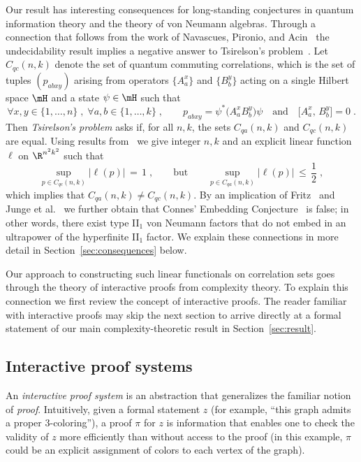 Our result has interesting consequences for long-standing conjectures in quantum information theory and the theory of von Neumann algebras. Through a connection that follows from the work of Navascues, Pironio, and Acin~\cite{navascues2008convergent} the undecidability result implies a negative answer to Tsirelson's problem~\cite{Tsi06}. Let $C_{qc}(n,k)$ denote the set of quantum commuting correlations, which is the set of tuples $(p_{abxy})$ arising from operators $\{A^x_a\}$ and $\{B^y_b\}$ acting on a single Hilbert space $\mH$ and a state $\psi \in \mH$ such that
\begin{equation}\label{eq:intro-qc}
 \forall x,y\in \{1,\ldots,n\}\;,\;\forall a,b\in\{1,\ldots,k\}\;,\qquad p_{abxy} = \psi^* \big( A^x_a B^y_b\big) \psi \quad\text{and}\quad  \big[A^x_a,\,B^y_b\big]=0\;.
\end{equation}
Then \emph{Tsirelson's problem} asks if, for all $n,k$, the sets $C_{qa}(n,k)$ and $C_{qc}(n,k)$ are equal. 
Using results from~\cite{navascues2008convergent} we give integer $n,k$ and an explicit linear function $\ell$ on $\R^{n^2k^2}$ such that 
\[ \sup_{p\in C_{qc}(n,k)} \big|\ell(p)\big| \,=\,1\;,\qquad\text{but}\qquad \sup_{p\in C_{qa}(n,k)} \big|\ell(p)\big| \,\leq\,\frac{1}{2}\;,\]
which implies that $C_{qa}(n,k)\neq C_{qc}(n,k)$. 
By an implication of Fritz~\cite{fritz2012tsirelson} and Junge et al.~\cite{junge2011connes} we further obtain that Connes' Embedding Conjecture~\cite{connes1976classification} is false; in other words, there exist type II$_1$ von Neumann factors that do not embed in an ultrapower of the hyperfinite II$_1$ factor. We explain these connections in more detail in Section~\ref{sec:consequences} below.

Our approach to constructing such linear functionals on correlation sets goes through the theory of 
interactive proofs from complexity theory. 
To explain this connection we first review the concept of interactive proofs. The reader familiar with interactive proofs may skip the next section to arrive directly at a formal statement of our main complexity-theoretic result in Section~\ref{sec:result}. 

\subsection{Interactive proof systems}
An \emph{interactive proof system} is an abstraction that generalizes the familiar notion of \emph{proof}. Intuitively, given a formal statement $z$ (for example, ``this graph admits a proper $3$-coloring''), a proof $\pi$ for $z$ is information that enables one to check the validity of $z$ more efficiently than without access to the proof (in this example, $\pi$ could be an explicit assignment of colors to each vertex of the graph). 

